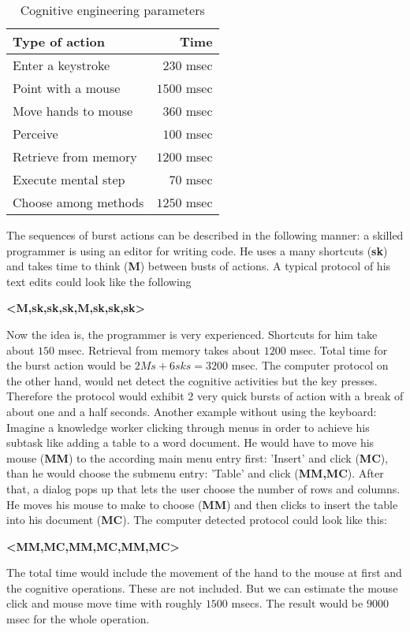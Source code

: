 \begin{table}[ht]
    \centering
    \begin{tabular}{lr} \toprule
    Type of action & Time \\ \midrule
    Enter a keystroke  & $230$ msec \\
    Point with a mouse  & $1500$ msec \\
    Move hands to mouse  & $360$ msec \\
    Perceive  & $100$ msec \\
    Retrieve from memory  & $1200$ msec \\
    Execute mental step  & $70$ msec \\
    Choose among methods  & $1250$ msec \\
    \bottomrule
\end{tabular}
 \caption{Cognitive engineering parameters}
 \label{tab1}
\end{table}

The sequences of burst actions can be described in the following manner: a skilled programmer is using an editor for writing code. He uses a many shortcuts (\textbf{sk}) and takes time to think (\textbf{M}) between busts of actions. A typical protocol of his text edits could look like the following
\begin{center}
  \textbf{<M,sk,sk,sk,M,sk,sk,sk>}
\end{center} 

Now the idea is, the programmer is very experienced. Shortcuts for him take about $150$ msec. Retrieval from memory takes about $1200$ msec. Total time for the burst action would be $ 2Ms + 6sks = 3200$ msec. The computer protocol on the other hand, would net detect the cognitive activities but the key presses. Therefore the protocol would exhibit 2 very quick bursts of action with a break of about one and a half seconds. 
Another example without using the keyboard: Imagine a knowledge worker clicking through menus in order to achieve his subtask like adding a table to a word document. He would have to move his mouse (\textbf{MM}) to the according main menu entry first: 'Insert' and click (\textbf{MC}), than he would choose the submenu entry: 'Table' and click (\textbf{MM,MC}). After that, a dialog pops up that lets the user choose the number of rows and columns. He moves his mouse to make to choose (\textbf{MM}) and then clicks to insert the table into his document (\textbf{MC}). The computer detected protocol could look like this:
\begin{center}
  \textbf{<MM,MC,MM,MC,MM,MC>}
\end{center} 

The total time would include the movement of the hand to the mouse at first and the cognitive operations. These are not included. But we can estimate the mouse click and mouse move time with roughly $1500$ msecs. The result would be $9000$ msec for the whole operation.
